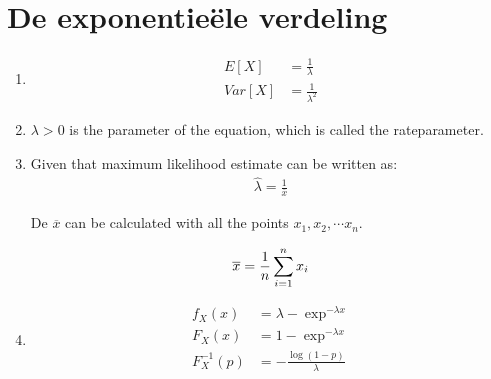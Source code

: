 \documentclass[a4paper,12px]{article}
\begin{document}


\section{}
\section{}
\section{De exponentie\"ele verdeling}

\begin{enumerate}
    \item
        \begin{equation}
        \begin{aligned}
            E[X] &= \frac{1}{\lambda}\\
            Var[X] &= \frac{1}{\lambda^2}
        \end{aligned}
        \end{equation}

    \item $\lambda > 0$ is the parameter of the equation, which is called the
        rateparameter.

    \item Given that maximum likelihood estimate can be written as:
        \begin{equation}
        \begin{aligned}
            \widehat{\lambda} = \frac{1}{\overline{x}}
        \end{aligned}
        \end{equation}

        De $\overline{x}$ can be calculated with all the points $x_1, x_2,
        \cdots x_n$.

        \begin{equation}
        \begin{aligned}
            \overline{x}={1 \over n}\sum_{i=1}^n x_i
        \end{aligned}
        \end{equation}

    \item
        \begin{equation}
        \begin{aligned}
            f_X(x) &= \lambda - \exp^{-\lambda x}\\
            F_X(x) &= 1 - \exp^{-\lambda x}\\
            F^{-1}_X(p) &= -\frac{\log{(1-p)}}{\lambda}\\
        \end{aligned}
        \end{equation}


\end{enumerate}
\end{document}
